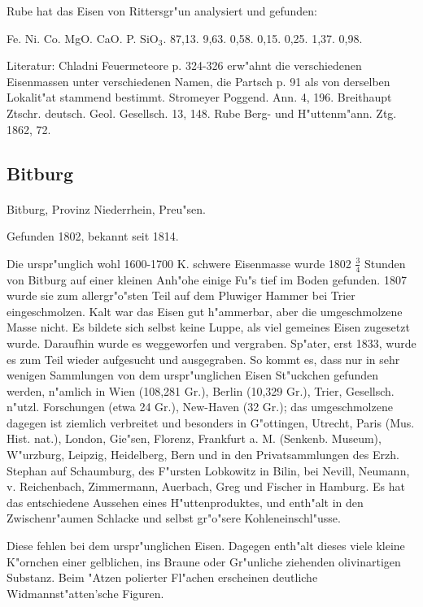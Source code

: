 \documentclass[a4paper, 11pt, oneside]{article}
\begin{document}
Rube hat das Eisen von Rittersgr"un analysiert und gefunden:

Fe. Ni. Co. MgO. CaO. P. SiO$_{3}$.  
87,13. 9,63. 0,58. 0,15. 0,25. 1,37. 0,98.

\footnotesize
Literatur: Chladni Feuermeteore p. 324-326 erw"ahnt die verschiedenen Eisenmassen unter verschiedenen Namen, die Partsch p. 91 als von derselben Lokalit"at stammend bestimmt. Stromeyer Poggend. Ann. 4, 196. Breithaupt Ztschr. deutsch. Geol. Gesellsch. 13, 148. Rube Berg- und H"uttenm"ann. Ztg. 1862, 72.

\subsection{Bitburg}
\normalsize
\paragraph{}
Bitburg, Provinz Niederrhein, Preu"sen.

Gefunden 1802, bekannt seit 1814.

Die urspr"unglich wohl 1600-1700 K. schwere Eisenmasse wurde 1802 $\frac{3}{4}$ Stunden von Bitburg auf einer kleinen Anh"ohe einige Fu"s tief im Boden gefunden. 1807 wurde sie zum allergr"o"sten Teil auf dem Pluwiger Hammer bei Trier eingeschmolzen. Kalt war das Eisen gut h"ammerbar, aber die umgeschmolzene Masse nicht. Es bildete sich selbst keine Luppe, als viel gemeines Eisen zugesetzt wurde. Daraufhin wurde es weggeworfen und vergraben. Sp"ater, erst 1833, wurde es zum Teil wieder aufgesucht und ausgegraben. So kommt es, dass nur in sehr wenigen Sammlungen von dem urspr"unglichen Eisen St"uckchen gefunden werden, n"amlich in Wien (108,281 Gr.), Berlin (10,329 Gr.), Trier, Gesellsch. n"utzl. Forschungen (etwa 24 Gr.), New-Haven (32 Gr.); das umgeschmolzene dagegen ist ziemlich verbreitet und besonders in G"ottingen, Utrecht, Paris (Mus. Hist. nat.), London, Gie"sen, Florenz, Frankfurt a. M. (Senkenb. Museum), W"urzburg, Leipzig, Heidelberg, Bern und in den Privatsammlungen des Erzh. Stephan auf Schaumburg, des F"ursten Lobkowitz in Bilin, bei Nevill, Neumann, v. Reichenbach, Zimmermann, Auerbach, Greg und Fischer in Hamburg. Es hat das entschiedene Aussehen eines H"uttenproduktes, und enth"alt in den Zwischenr"aumen Schlacke und selbst gr"o"sere Kohleneinschl"usse.

Diese fehlen bei dem urspr"unglichen Eisen. Dagegen enth"alt dieses viele kleine K"ornchen einer gelblichen, ins Braune oder Gr"unliche ziehenden olivinartigen Substanz. Beim "Atzen polierter Fl"achen erscheinen deutliche Widmannst"atten'sche Figuren.
\end{document}
